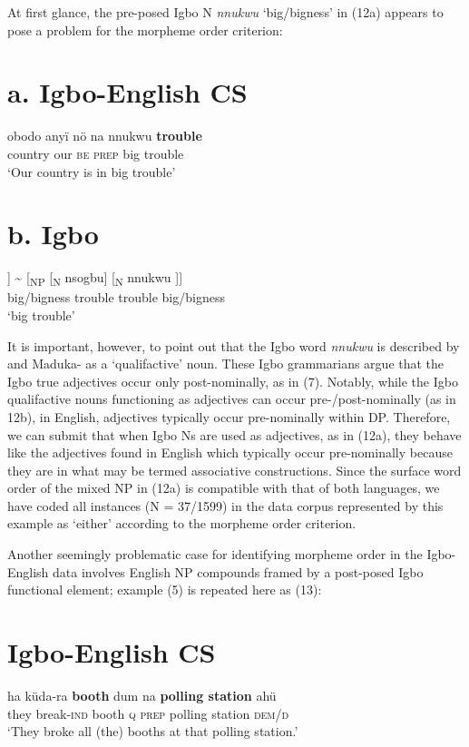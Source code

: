\documentclass[output=paper]{langsci/langscibook}
\begin{document}
At first glance, the pre-posed Igbo N \textit{nnukwu }‘big/bigness’ in (12a) appears to pose a problem for the morpheme order criterion:

\chapter{a. Igbo-English CS}
\gll obodo  anyï  nö    na  nnukwu  \textbf{trouble}\\
     country  our    \textsc{be}\textsubscript{  }\textsc{prep}\textsubscript{   }big     trouble\\
\glt ‘Our country is in big trouble’
\z

\chapter{b. Igbo }
\gll [\textsubscript{NP}\textsuperscript{ }[\textsubscript{N }nnukwu]  [\textsubscript{N }nsogbu]] {\textasciitilde} [\textsubscript{NP }[\textsubscript{N  }nsogbu] [\textsubscript{N }nnukwu\textsubscript{ }]]  \\
              big/bigness  trouble                  trouble       big/bigness    \\
\glt ‘big trouble’
\z

It is important, however, to point out that the Igbo word \textit{nnukwu }is described by \citet[47-8]{Emenanjo1978} and Maduka-\citet[237]{Durunze1990} as a ‘qualifactive’ noun. These Igbo grammarians argue that the Igbo true adjectives occur only post-nominally, as in (7). Notably, while the Igbo qualifactive nouns functioning as adjectives can occur pre-/post-nominally (as in 12b), in English, adjectives typically occur pre-nominally within DP. Therefore, we can submit that when Igbo Ns are used as adjectives, as in (12a), they behave like the adjectives found in English which typically occur pre-nominally because they are in what may be termed associative constructions. Since the surface word order of the mixed NP in (12a) is compatible with that of both languages, we have coded all instances (N = 37/1599) in the data corpus represented by this example as ‘either’ according to the morpheme order criterion. 

Another seemingly problematic case for identifying morpheme order in the Igbo-English data involves English NP compounds framed by a post-posed Igbo functional element; example (5) is repeated here as (13):

\chapter{Igbo-English CS}
\gll ha    küda-ra  \textbf{booth }dum   na    \textbf{polling station }ahü\\
     they break-\textsc{ind}  booth  \textsc{q}  \textsc{prep}  polling station   \textsc{dem/d}\\
\glt ‘They broke all (the) booths at that polling station.’ \textsubscript{ } 
\z
\end{document}
